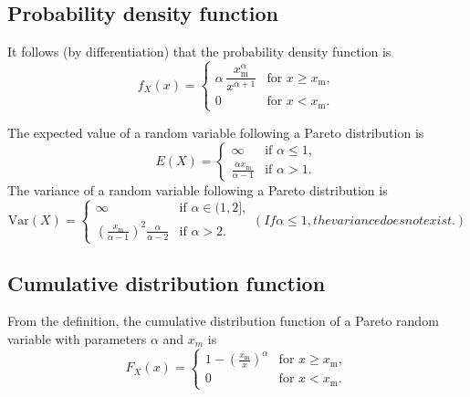 \documentclass[]{report}
\begin{document}
{\subsection{Probability density function}
It follows (by differentiation) that the probability density function is
\[
f_X(x)= \begin{cases} \alpha\,\dfrac{x_\mathrm{m}^\alpha}{x^{\alpha+1}} & \mbox{for }x \ge x_\mathrm{m}, \\[12pt] 0 & \mbox{for } x < x_\mathrm{m}. \end{cases} 
\]



The expected value of a random variable following a Pareto distribution is
\[
E(X)= \begin{cases} \infty & \text{if }\alpha\le 1, \\ \frac{\alpha x_\mathrm{m}}{\alpha-1} & \text{if }\alpha>1. \end{cases}
\]
The variance of a random variable following a Pareto distribution is
\[
\mathrm{Var}(X)= \begin{cases} \infty & \text{if }\alpha\in(1,2], \\ \left(\frac{x_\mathrm{m}}{\alpha-1}\right)^2 \frac{\alpha}{\alpha-2} & \text{if }\alpha>2. \end{cases}
(If \alpha\le 1, the variance does not exist.)
\]






\subsection{Cumulative distribution function}

From the definition, the cumulative distribution function of a Pareto random variable with parameters $\alpha$ and $x_m$ is
\[F_X(x) = \begin{cases}
1-\left(\frac{x_\mathrm{m}}{x}\right)^\alpha & \mbox{for } x \ge x_\mathrm{m}, \\
0 & \mbox{for }x < x_\mathrm{m}.
\end{cases}
\]


{
\begin{itemize}


\end{itemize}}}
\end{document}
